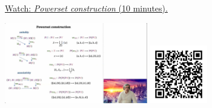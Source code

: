 
\begin{minipage}{10cm}
    \href{https://act4e-spring21.netlify.app/videos/spring2021-monads-a:monad-powerset.html}{Watch: \emph{Powerset construction} (10 minutes).}
        
    \href{https://act4e-spring21.netlify.app/videos/spring2021-monads-a:monad-powerset.html}{\includegraphics[height=3.5cm]{spring2021-monads-a:monad-powerset/thumbnails.jpg}}
    \href{https://act4e-spring21.netlify.app/videos/spring2021-monads-a:monad-powerset.html}{\includegraphics[height=2.5cm]{spring2021-monads-a:monad-powerset/qrcode.png}}
\end{minipage}
